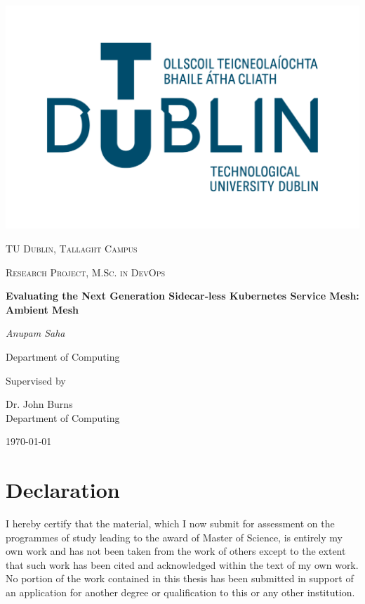 \documentclass[12pt]{article}
\begin{document}
\thispagestyle{empty}
\setlength\headheight{0pt} 
\begin{center}

\begin{center}
\includegraphics[width=0.65\linewidth]{resources/TUD_Logo.png}
\end{center}	

        \vspace{0.25cm}
        {\scshape\LARGE TU Dublin, Tallaght Campus \par}
        \vspace{0.25cm}
        {\scshape\Large Research Project, M.Sc. in DevOps\par}
        \vspace{0.5cm}

        {\Large\bfseries Evaluating the Next Generation Sidecar-less Kubernetes Service Mesh: Ambient Mesh\par}
        
        \vspace{0.5cm}
        {\Large\itshape Anupam Saha\par}
        Department of Computing
        \vspace{0.25cm}

\vspace{1cm}
Supervised by\par
Dr. John Burns \\
Department of Computing\par
\vspace{1.5cm}
\large
\today

\end{center}

\clearpage
\restoregeometry
\justify

\section*{Declaration}
I hereby certify that the material, which I now submit for assessment on the programmes of study leading to the award of Master of Science, is entirely my own work and has not been taken from the work of others except to the extent that such work has been cited and acknowledged within the text of my own work. No portion of the work contained in this thesis has been submitted in support of an application for another degree or qualification to this or any other institution.
\end{document}
